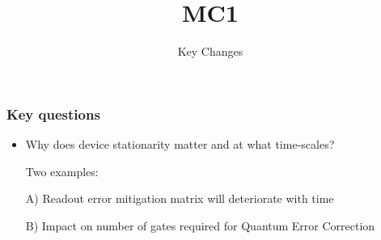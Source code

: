 \documentclass[x11names, svgnames]{beamer}
\title{MC1}
\subtitle{Key Changes}
\begin{document}
\frame[plain]{\titlepage}
\addtocounter{framenumber}{-1}

\begin{frame}[allowframebreaks]
\frametitle{Key questions}
\scriptsize
\begin{itemize}
\item Why does device stationarity matter and at what time-scales?

Two examples:

A) Readout error mitigation matrix will deteriorate with time

B) Impact on number of gates required for Quantum Error Correction

\end{itemize}
\end{frame}
\end{document}
